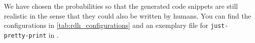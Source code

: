 \documentclass[%
class=scrreprt,
chapterprefix=false,%
open=right,%
twoside=false,%
paper=a4,%
logofile={Logo\_zentral\_farbig\_EN.png},%
thesistype=master,%
UKenglish,%
]{se2thesis}
\theoremstyle{definition}
\newcommand{\Mods}{Modificatations\xspace}
\newcommand{\RDHs}{Readability Decreasing \Mods\xspace}
\newcommand{\none}{just-pretty-print\xspace} %
\newcommand{\nonet}{\texttt{\none}\xspace} %
\begin{document}
	We have chosen the probabilities so that the generated code snippets are still realistic in the sense that they could also be written by humans. You can find the configurations in \autoref{tab:rdh_configurations} and an exemplary file for \nonet in .
	
	
\end{document}
